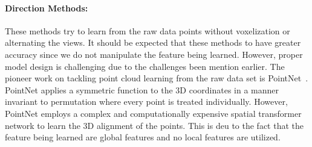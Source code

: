 \paragraph{Direction Methods:}
These methods try to learn from the raw data points without voxelization or alternating the views. It should be expected that these methods to have greater accuracy since we do not manipulate the feature being learned. However, proper model design is challenging due to the challenges been mention earlier. The pioneer work on tackling point cloud learning from the raw data set is PointNet~\citep{pointnet}. PointNet applies a symmetric function to the 3D coordinates in a manner invariant to permutation where every point is treated individually. However, PointNet employs a complex and computationally expensive spatial transformer network to learn the 3D alignment of the points. This is deu to the fact that the feature being learned are global features and no local features are utilized.  
